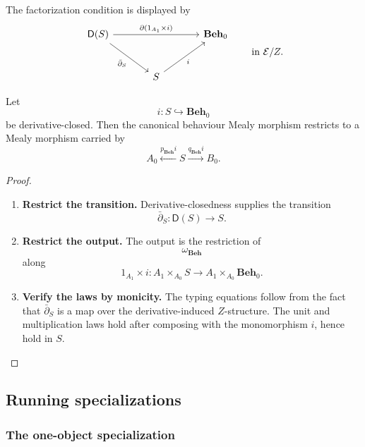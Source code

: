 The factorization condition is displayed by
\[
    \begin{tikzcd}[column sep=large, row sep=large]
            \mathsf D(S)
                \arrow[rr, "{\partial(1_{A_1}\times i)}"]
                \arrow[dr, "\bar\partial_S"']
        &
        &
            \mathbf{Beh}_0
        \\
        &
            S
                \arrow[ur, "i"']
        &
    \end{tikzcd}
    \qquad
    \text{in }\mathcal E/Z.
\]

\begin{lemma}
\label{lem:restriction-derivative-closed-subobject}
    Let
    \[
        i:S\hookrightarrow\mathbf{Beh}_0
    \]
    be derivative-closed. Then the canonical behaviour Mealy morphism restricts to a Mealy morphism carried by
    \[
        A_0\xleftarrow{p_{\mathbf{Beh}}i}S
        \xrightarrow{q_{\mathbf{Beh}}i}B_0.
    \]
\end{lemma}
\begin{proof}
    \leavevmode
    \begin{enumerate}
        \item \textbf{Restrict the transition.} Derivative-closedness supplies the transition
        \[
            \bar\partial_S:\mathsf D(S)\to S.
        \]

        \item \textbf{Restrict the output.} The output is the restriction of
        \[
            \omega_{\mathbf{Beh}}
        \]
        along
        \[
            1_{A_1}\times i:
            A_1\times_{A_0}S\to
            A_1\times_{A_0}\mathbf{Beh}_0.
        \]

        \item \textbf{Verify the laws by monicity.} The typing equations follow from the fact that \(\bar\partial_S\) is a map over the derivative-induced \(Z\)-structure. The unit and multiplication laws hold after composing with the monomorphism \(i\), hence hold in \(S\).
    \end{enumerate}
\end{proof}

\subsection{Running specializations}
\label{subsec:cleavage-running-specializations}

\subsubsection{The one-object specialization}

